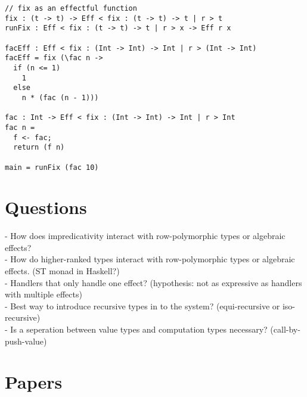 \documentclass[12pt]{article}
\begin{document}
\newpage
\begin{lstlisting}[caption=Recursion effect]
// fix as an effectful function
fix : (t -> t) -> Eff < fix : (t -> t) -> t | r > t
runFix : Eff < fix : (t -> t) -> t | r > x -> Eff r x 

facEff : Eff < fix : (Int -> Int) -> Int | r > (Int -> Int)
facEff = fix (\fac n ->
  if (n <= 1)
    1
  else
    n * (fac (n - 1)))

fac : Int -> Eff < fix : (Int -> Int) -> Int | r > Int
fac n =
  f <- fac;
  return (f n)

main = runFix (fac 10)
\end{lstlisting}

\newpage
\section{Questions}
- How does impredicativity interact with row-polymorphic types or algebraic effects? \\
- How do higher-ranked types interact with row-polymorphic types or algebraic effects. (ST monad in Haskell?) \\
- Handlers that only handle one effect? (hypothesis: not as expressive as handlers with multiple effects) \\
- Best way to introduce recursive types in to the system? (equi-recursive or iso-recursive) \\
- Is a seperation between value types and computation types necessary? (call-by-push-value) \\

\section{Papers}
\end{document}
